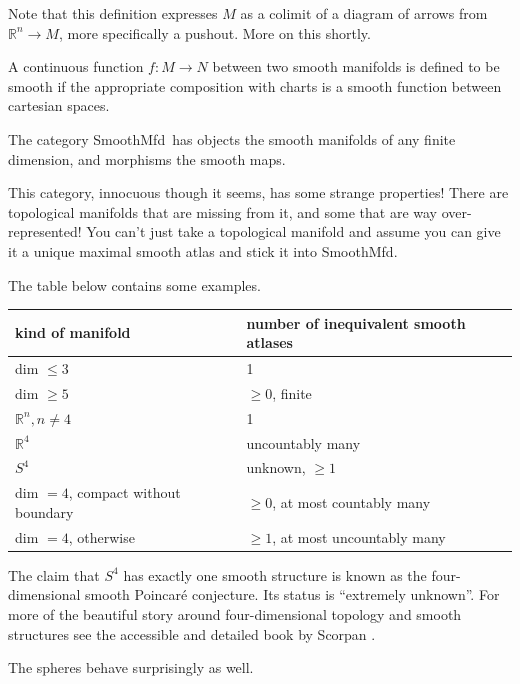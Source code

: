 \documentclass[12pt]{article}
\newcommand{\rr}{\ensuremath{\mathbb{R}}}
\newcommand{\smfd}{\textsf{SmoothMfd}}
\begin{document}
Note that this definition expresses $M$ as a colimit of a diagram of arrows from $\rr^n\to M$, more specifically a pushout. More on this shortly.

A continuous function $f:M\to N$ between two smooth manifolds is defined to be smooth if the appropriate composition with charts is a smooth function between cartesian spaces.

The category \smfd\ has objects the smooth manifolds of any finite dimension, and morphisms the smooth maps.

This category, innocuous though it seems, has some strange properties! There are topological manifolds that are missing from it, and some that are way over-represented! You can't just take a topological manifold and assume you can give it a unique maximal smooth atlas and stick it into \smfd.

The table below contains some examples.

\begin{center}
\label{table:smoothstructures}
\begin{tabular}{|l|l|}
\hline
kind of manifold & number of inequivalent smooth atlases \\ \hline
dim $\leq 3$ & 1 \\ \hline
dim $\geq 5$ & $\geq 0$, finite \\ \hline
$\rr^n, n\neq 4$ & 1 \\ \hline
$\rr^4$ & uncountably many \\ \hline
$S^4$ & unknown, $\geq 1$ \\ \hline
dim $= 4$, compact without boundary & $\geq 0$, at most countably many \\ \hline
dim $= 4$, otherwise & $\geq 1$, at most uncountably many \\ \hline
\end{tabular}
\end{center}

The claim that $S^4$ has exactly one smooth structure is known as the four-dimensional smooth Poincaré conjecture. Its status is ``extremely unknown''. For more of the beautiful story around four-dimensional topology and smooth structures see the accessible and detailed book by Scorpan \cite{scorpan_wild_2005}.

The spheres behave surprisingly as well.
\end{document}
